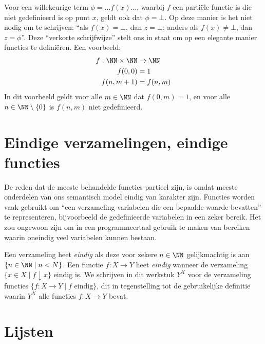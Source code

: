 Voor een willekeurige term $\phi = \dots f(x)\dots$, waarbij $f$ een partiële functie is die niet gedefinieerd is op punt $x$, geldt ook dat $\phi = \bot$. Op deze manier is het niet nodig om te schrijven: “als $f(x) = \bot$, dan $z = \bot$; anders als $f(x) \neq \bot$, dan $z = \phi$”. Deze “verkorte schrijfwijze” stelt ons in staat om op een elegante manier functies te definiëren. Een voorbeeld:
\begin{align*}
  f : \NN \times \NN &\to \NN \\
  f(0, 0) &= 1 \\
  f(n, m + 1) &= f(n, m)
\end{align*}
In dit voorbeeld geldt voor alle $m \in \NN$ dat $f(0, m) = 1$, en voor alle $n \in \NN \setminus \{0\}$ is $f(n, m)$ niet gedefinieerd.

\section{Eindige verzamelingen, eindige functies}
\label{sec:eindigefuncties}

De reden dat de meeste behandelde functies partieel zijn, is omdat meeste onderdelen van ons semantisch model eindig van karakter zijn. Functies worden vaak gebruikt om “een verzameling variabelen die een bepaalde waarde bevatten” te representeren, bijvoorbeeld de gedefinieerde variabelen in een zeker bereik. Het zou ongewoon zijn om in een programmeertaal gebruik te maken van bereiken waarin oneindig veel variabelen kunnen bestaan.

Een verzameling heet \emph{eindig} als deze voor zekere $n \in \NN$ gelijkmachtig is aan $\{n \in \NN \mid n < N\}$.
Een functie $f: X \to Y$ heet \emph{eindig} wanneer de verzameling $\{x \in X \mid f \downarrow x\}$ eindig is.
We schrijven in dit werkstuk $Y^X$ voor de verzameling functies $\{f : X \to Y \mid f \text{ eindig} \}$, dit in tegenstelling tot de gebruikelijke definitie waarin $Y^X$ alle functies $f : X \to Y$ bevat.

\section{Lijsten}
\label{sec:lijsten}

